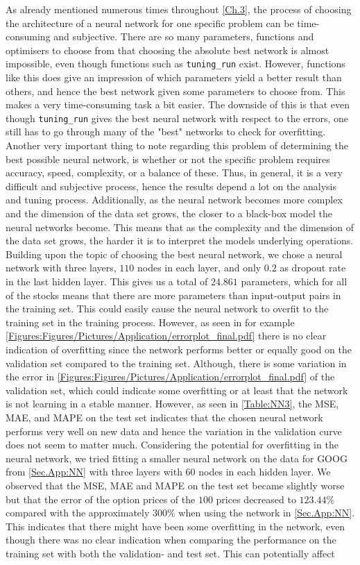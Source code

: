 As already mentioned numerous times throughout \autoref{Ch.3}, the process of choosing the architecture of a neural network for one specific problem can be time-consuming and subjective. There are so many parameters, functions and optimisers to choose from that choosing the absolute best network is almost impossible, even though functions such as \lstinline{tuning_run} exist. However, functions like this does give an impression of which parameters yield a better result than others, and hence the best network given some parameters to choose from. This makes a very time-consuming task a bit easier. The downside of this is that even though \lstinline{tuning_run} gives the best neural network with respect to the errors, one still has to go through many of the "best" networks to check for overfitting. Another very important thing to note regarding this problem of determining the best possible neural network, is whether or not the specific problem requires accuracy, speed, complexity, or a balance of these. Thus, in general, it is a very difficult and subjective process, hence the results depend a lot on the analysis and tuning process. Additionally, as the neural network becomes more complex and the dimension of the data set grows, the closer to a black-box model the neural networks become. This means that as the complexity and the dimension of the data set grows, the harder it is to interpret the models underlying operations. Building upon the topic of choosing the best neural network, we chose a neural network with three layers, $110$ nodes in each layer, and only $0.2$ as dropout rate in the last hidden layer. This gives us a total of $24.861$ parameters, which for all of the stocks means that there are more parameters than input-output pairs in the training set. This could easily cause the neural network to overfit to the training set in the training process. However, as seen in for example \autoref{Figures:Figures/Pictures/Application/errorplot_final.pdf} there is no clear indication of overfitting since the network performs better or equally good on the validation set compared to the training set. Although, there is some variation in the error in \autoref{Figures:Figures/Pictures/Application/errorplot_final.pdf} of the validation set, which could indicate some overfitting or at least that the network is not learning in a stable manner. However, as seen in \autoref{Table:NN3}, the MSE, MAE, and MAPE on the test set indicates that the chosen neural network performs very well on new data and hence the variation in the validation curve does not seem to matter much. Considering the potential for overfitting in the neural network, we tried fitting a smaller neural network on the data for GOOG from \autoref{Sec.App:NN} with three layers with $60$ nodes in each hidden layer. We observed that the MSE, MAE and MAPE on the test set became slightly worse but that the error of the option prices of the $100$ prices decreased to $123.44\%$ compared with the approximately $300\%$ when using the network in \autoref{Sec.App:NN}. This indicates that there might have been some overfitting in the network, even though there was no clear indication when comparing the performance on the training set with both the validation- and test set. This can potentially affect 